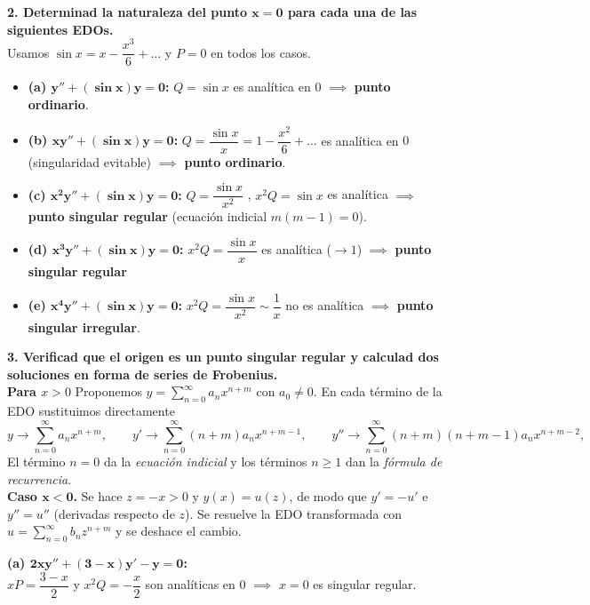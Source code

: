 \documentclass[11pt, a4paper]{article}
\begin{document}
\noindent\textbf{2. Determinad la naturaleza del punto $\bm{x=0}$ para cada una de las siguientes EDOs.} \\
Usamos $\sin x = x - \dfrac{x^3}{6}+\dots$ y $P=0$ en todos los casos.
\begin{itemize}
\item \textbf{(a) $\bm{y''+(\sin x)y=0}$:} $Q=\sin x$ es analítica en $0$ $\implies$ \textbf{punto ordinario}.
\item \textbf{(b) $\bm{xy''+(\sin x)y=0}$:} $Q=\dfrac{\sin x}{x}=1-\dfrac{x^2}{6}+\dots$ es analítica en $0$ (singularidad evitable) $\implies$ \textbf{punto ordinario}.
\item \textbf{(c) $\bm{x^2y''+(\sin x)y=0}$:} $Q=\dfrac{\sin x}{x^2}$ , $x^2Q=\sin x$ es analítica $\implies$ \textbf{punto singular regular} (ecuación indicial $m(m-1)=0$).
\item \textbf{(d) $\bm{x^3y''+(\sin x)y=0}$:} $x^2Q=\dfrac{\sin x}{x}$ es analítica ($\to1$) $\implies$ \textbf{punto singular regular}
\item \textbf{(e) $\bm{x^4y''+(\sin x)y=0}$:} $x^2Q=\dfrac{\sin x}{x^2}\sim\dfrac1x$ no es analítica $\implies$ \textbf{punto singular irregular}.
\end{itemize}

\noindent\textbf{3. Verificad que el origen es un punto singular regular y calculad dos soluciones en forma de series de Frobenius.} \\
\textbf{Para $x>0$}  Proponemos $y=\sum_{n=0}^\infty a_nx^{n+m}$ con $a_0\neq0$. En cada término de la EDO sustituimos directamente
\[
y\to\sum_{n=0}^\infty a_nx^{n+m},\qquad y'\to\sum_{n=0}^\infty (n+m)a_nx^{n+m-1},\qquad y''\to\sum_{n=0}^\infty (n+m)(n+m-1)a_nx^{n+m-2},
\]
El término $n=0$ da la \emph{ecuación indicial} y los términos $n\geq1$ dan la \emph{fórmula de recurrencia}. \\
\textbf{Caso $\bm{x<0}$.} Se hace $z=-x>0$ y $y(x)=u(z)$, de modo que $y'=-u'$ e $y''=u''$ (derivadas respecto de $z$). Se resuelve la EDO transformada con $u=\sum_{n=0}^\infty b_nz^{n+m}$ y se deshace el cambio.

\medskip
\noindent\textbf{(a) $\bm{2xy''+(3-x)y'-y=0}$:} \\
$xP=\dfrac{3-x}{2}$ y $x^2Q=-\dfrac{x}{2}$ son analíticas en $0$ $\implies$ $x=0$ es singular regular.
\end{document}

